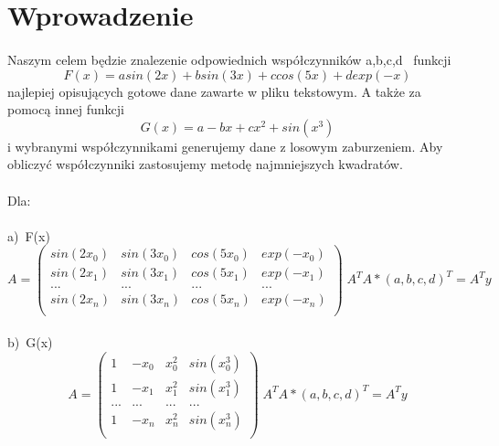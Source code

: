 \documentclass{article}
\begin{document}
\section{Wprowadzenie}

\paragraph{}

Naszym celem będzie znalezenie odpowiednich współczynników a,b,c,d \
funkcji  \begin{equation} F(x) = asin(2x) + bsin(3x) + ccos(5x) + dexp(-x) \end{equation} 
najlepiej opisujących gotowe  dane zawarte w pliku tekstowym. A także za pomocą innej funkcji 
\begin{equation} G(x) =  a - bx + cx^2 + sin(x^3) \end{equation} i wybranymi współczynnikami generujemy dane z losowym zaburzeniem.
Aby obliczyć współczynniki zastosujemy metodę najmniejszych kwadratów.

\paragraph{}
Dla: 

\paragraph{}
a)\ F(x)
\begin{equation*}
    A =  \begin{pmatrix}
        sin(2x_0) &sin(3x_0)& cos(5x_0) & exp(-x_0)\\
        sin(2x_1)& sin(3x_1)& cos(5x_1) &exp(-x_1)\\
        ...& ...& ... &...\\
        sin(2x_n)& sin(3x_n)& cos(5x_n)& exp(-x_n)\\
        \end{pmatrix}
	\;  A^{T}A *  (a,b,c,d)^T = A^{T}y
\end{equation*}

\paragraph{}
b)\ G(x)
\begin{equation*}
   A =  \begin{pmatrix}
        1 &-x_0& x_0^2 & sin(x_0^3)\\
        1& -x_1& x_1^2 &sin(x_1^3)\\
        ...& ...& ... &...\\
        1& -x_n& x_n^2& sin(x_n^3)\\
        \end{pmatrix}
	\;  A^{T}A *  (a,b,c,d)^T = A^{T}y
\end{equation*}
\end{document}

